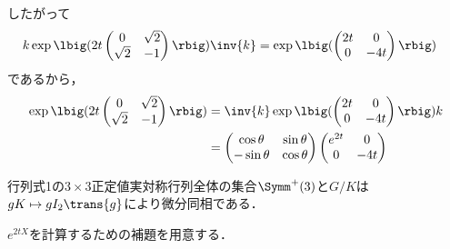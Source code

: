 \begin{npfwn}
  したがって
  \begin{align*}
    k\exp\lbig(2t\begin{pmatrix}
      0 & \sqrt{2} \\
      \sqrt{2} & -1 
    \end{pmatrix}\rbig)\inv{k} &= \exp\lbig(
                                 \begin{pmatrix}
                                   2t & 0 \\ 0 & -4t
                                 \end{pmatrix}\rbig)
  \end{align*}
  であるから，
  \begin{align*}
    \exp\lbig(2t\begin{pmatrix}
      0 & \sqrt{2} \\
      \sqrt{2} & -1 
    \end{pmatrix}\rbig) &= \inv{k} \exp\lbig(
                                 \begin{pmatrix}
                                   2t & 0 \\ 0 & -4t
                                 \end{pmatrix}\rbig)k\\
        &=
          \begin{pmatrix}
            \cos \theta  & \sin \theta \\ -\sin \theta & \cos \theta
          \end{pmatrix}
                                                         \begin{pmatrix}
                                                           e^{2t} & 0 \\ 0 & -4t
                                                         \end{pmatrix}
  \end{align*}
\end{npfwn}

\begin{npfwn}
  行列式1の$3\times 3$正定値実対称行列全体の集合$\Symm^{+}(3)$と$G/K$は$gK \mapsto gI_2\trans{g} $により微分同相である．
  
  $e^{2tX} $を計算するための補題を用意する．
  
  
  
\end{npfwn}
